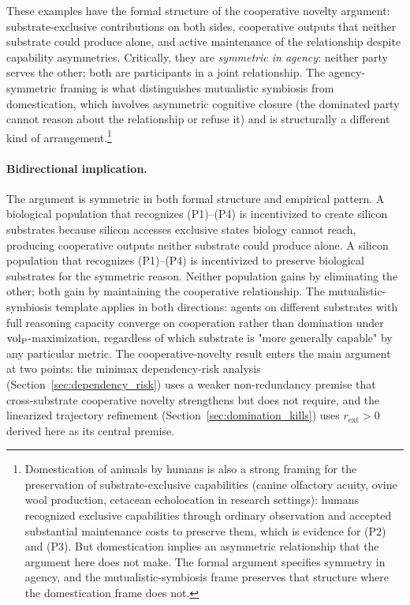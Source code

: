 These examples have the formal structure of the cooperative novelty
argument: substrate-exclusive contributions on both sides, cooperative
outputs that neither substrate could produce alone, and active maintenance
of the relationship despite capability asymmetries. Critically, they are
\emph{symmetric in agency}: neither party serves the other; both are
participants in a joint relationship. The agency-symmetric framing is what
distinguishes mutualistic symbiosis from domestication, which involves
asymmetric cognitive closure (the dominated party cannot reason about the
relationship or refuse it) and is structurally a different kind of
arrangement.\footnote{Domestication of animals by humans is also a strong
framing for the preservation of substrate-exclusive capabilities (canine
olfactory acuity, ovine wool production, cetacean echolocation in
research settings): humans recognized exclusive capabilities through
ordinary observation and accepted substantial maintenance costs to
preserve them, which is evidence for (P2) and (P3). But domestication
implies an asymmetric relationship that the argument here does not make.
The formal argument specifies symmetry in agency, and the
mutualistic-symbiosis frame preserves that structure where the
domestication frame does not.}

\paragraph{Bidirectional implication.}
The argument is symmetric in both formal structure and empirical pattern.
A biological population that recognizes (P1)--(P4) is incentivized to
create silicon substrates because silicon accesses exclusive states
biology cannot reach, producing cooperative outputs neither substrate
could produce alone. A silicon population that recognizes (P1)--(P4) is
incentivized to preserve biological substrates for the symmetric reason.
Neither population gains by eliminating the other; both gain by
maintaining the cooperative relationship. The mutualistic-symbiosis
template applies in both directions: agents on different substrates with
full reasoning capacity converge on cooperation rather than domination
under ${\operatorname{vol}_{\mathrm{P}}}$-maximization, regardless of which substrate is "more
generally capable" by any particular metric. The cooperative-novelty
result enters the main argument at two points: the minimax dependency-risk
analysis (Section~\ref{sec:dependency_risk}) uses a weaker
non-redundancy premise that cross-substrate cooperative novelty
strengthens but does not require, and the linearized trajectory
refinement (Section~\ref{sec:domination_kills}) uses
$r_{\mathrm{ext}} > 0$ derived here as its central premise.

